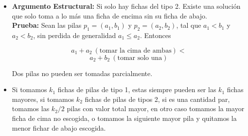 \documentclass[12pt]{beamer}
\begin{document}
\begin{frame}
\begin{bloque}

\begin{itemize}
    \item \textbf{Argumento Estructural:} Si solo hay fichas del tipo 2. Existe una solución que solo toma a lo más una ficha de encima sin su ficha de abajo.\\
    \pause
    \textbf{Prueba:} Sean las pilas $p_1 = (a_1, b_1)$ y $p_2 = (a_2, b_2)$, tal que $a_1 < b_1$ y $a_2 < b_2$, sin perdida de generalidad $a_1 \le a_2$. Entonces

\[
    a_1 + a_2 ~(\text{tomar la cima de ambas}) < 
\]
\[
    a_2 + b_2 ~(\text{tomar solo una})
\]

    Dos pilas no pueden ser tomadas parcialmente.

\end{itemize}

\end{bloque}
\end{frame}

\begin{frame}
\begin{bloque}

\begin{itemize}
    
    \item Si tomamos $k_1$ fichas de pilas de tipo 1, estas siempre pueden ser las $k_1$ fichas mayores, si tomamos $k_2$ fichas de pilas de tipos 2, si es una cantidad par, tomamos las $k_2 / 2$ pilas con valor total mayor, en otro caso tomamos la mayor ficha de cima no escogida, o tomamos la siguiente mayor pila y quitamos la menor fichar de abajo escogida.   
    
\end{itemize}

\end{bloque}
\end{frame}
\end{document}
